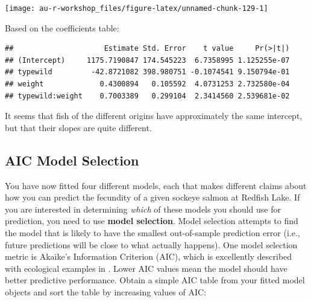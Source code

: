 \documentclass[]{book}
\newenvironment{Shaded}{\begin{snugshade}}{\end{snugshade}}
\newcommand{\KeywordTok}[1]{\textcolor[rgb]{0.13,0.29,0.53}{\textbf{#1}}}
\newcommand{\StringTok}[1]{\textcolor[rgb]{0.31,0.60,0.02}{#1}}
\newcommand{\OperatorTok}[1]{\textcolor[rgb]{0.81,0.36,0.00}{\textbf{#1}}}
\newcommand{\NormalTok}[1]{#1}
\theoremstyle{definition}
\theoremstyle{definition}
\theoremstyle{definition}
\theoremstyle{remark}
\begin{document}
\begin{center}\texttt{[image: au-r-workshop\_files/figure-latex/unnamed-chunk-129-1]} \end{center}

Based on the coefficients table:

\begin{Shaded}
\end{Shaded}

\begin{verbatim}
##                     Estimate Std. Error    t value     Pr(>|t|)
## (Intercept)     1175.7190847 174.545223  6.7358995 1.125255e-07
## typewild         -42.8721082 398.980751 -0.1074541 9.150794e-01
## weight             0.4300894   0.105592  4.0731253 2.732580e-04
## typewild:weight    0.7003389   0.299104  2.3414560 2.539681e-02
\end{verbatim}

It seems that fish of the different origins have approximately the same
intercept, but that their slopes are quite different.

\subsection{AIC Model Selection}\label{aic-model-selection}

You have now fitted four different models, each that makes different
claims about how you can predict the fecundity of a given sockeye salmon
at Redfish Lake. If you are interested in determining \emph{which} of
these models you should use for prediction, you need to use
\textbf{model selection}. Model selection attempts to find the model
that is likely to have the smallest out-of-sample prediction error
(i.e., future predictions will be close to what actually happens). One
model selection metric is Akaike's Information Criterion (AIC), which is
excellently described with ecological examples in \citet{aic-cite}.
Lower AIC values mean the model should have better predictive
performance. Obtain a simple AIC table from your fitted model objects
and sort the table by increasing values of AIC:

\begin{Shaded}
\end{Shaded}
\end{document}
